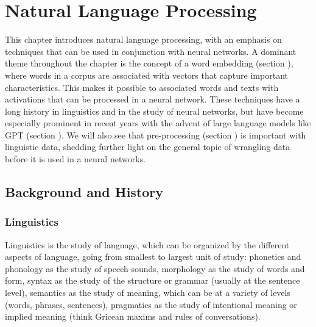 \chapter{Natural Language Processing}\label{ch_nlp}

This chapter introduces natural language processing, with an emphasis on techniques that can be used in conjunction with neural networks. A dominant theme throughout the chapter is the concept of a word embedding (section ), where words in a corpus are associated with vectors that capture important characteristics. This makes it possible to associated words and texts with activations that can be processed in a neural network. These techniques have a long history in linguistics and in the study of neural networks, but have become especially prominent in recent years with the advent of large language models like GPT (section ). We will also see that pre-processing (section ) is important with linguistic data, shedding further light on the general topic of wrangling data before it is used in a neural networks.


\section{Background and History}

\subsection{Linguistics}

Linguistics is the study of language, which can be organized by the different aspects of language, going from smallest to largest unit of study: phonetics and phonology as the study of speech sounds, morphology as the study of words and form, syntax as the study of the structure or grammar (usually at the sentence level), semantics as the study of meaning, which can be at a variety of levels (words, phrases, sentences), pragmatics as the study of intentional meaning or implied meaning (think Gricean maxims and rules of conversations). 


